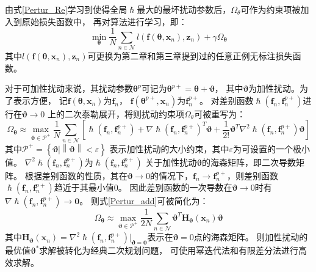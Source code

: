 由式\eqref{Pertur_Re}学习到使得全局$\hslash$最大的最坏扰动参数后，$\Omega_{\theta}$可作为约束项被加入到原始损失函数中，
再对算法进行学习，即：
\begin{equation}
    \label{Loss_Pertur_Re}
    \min _{\boldsymbol\theta} 
    \frac{1}{N} \sum_{n \in \mathcal{N}}l(\boldsymbol f\left(\boldsymbol\theta,\boldsymbol x_n\right), \boldsymbol{z}_n)
    +\gamma \Omega_{\boldsymbol\theta}
\end{equation}
其中$l(\boldsymbol f\left(\boldsymbol\theta,\boldsymbol x_n\right), \boldsymbol{z}_n)$可更换为第二章和第三章提到过的任意正例无标注损失函数。

对于可加性扰动来说，其扰动参数$\boldsymbol\theta^p$可记为$\boldsymbol\theta^{p+}=\boldsymbol\theta+\boldsymbol\vartheta $，
其中$\boldsymbol\vartheta$为加性扰动。为了表示方便，
记$\boldsymbol f\left(\boldsymbol\theta,\boldsymbol x_n\right)$为$\boldsymbol f_n$，
$\boldsymbol f\left(\boldsymbol\theta^{p+},\boldsymbol x_n\right)$为$\boldsymbol f_n^{p+}$。
对差别函数$\hslash\left(\boldsymbol f_n,\boldsymbol f_n^{p+}\right)$进行在$\boldsymbol \vartheta \to 0$
上的二次泰勒展开，将则扰动约束项$\Omega_{\theta}$可被重写为：
\begin{equation}
    \label{Pertur_add}
    \Omega_{\boldsymbol\theta}\approx \max _{\boldsymbol \vartheta \in \mathcal{P}^+}  \frac{1}{N} \sum_{n \in \mathcal{N}} \left[
    \hslash\left(\boldsymbol f_n,\boldsymbol f_n^{p+}\right)
    +{\nabla\hslash\left(\boldsymbol f_n,\boldsymbol f_n^{p+}\right)}^T \boldsymbol \vartheta
    +\frac{1}{2!}{\boldsymbol \vartheta}^T \nabla^2\hslash\left(\boldsymbol f_n,\boldsymbol f_n^{p+}\right) \boldsymbol \vartheta
    \right]
\end{equation}
其中$\mathcal{P}^+=\left\{\boldsymbol\vartheta | \left\|\boldsymbol\vartheta\right\|<\varepsilon \right\}$
表示加性扰动的大小约束，其中$\varepsilon$为可设置的一个极小值。
$\nabla^2\hslash\left(\boldsymbol f_n,\boldsymbol f_n^{p+}\right)$为$\hslash\left(\boldsymbol f_n,\boldsymbol f_n^{p+}\right)$
关于加性扰动$\boldsymbol \vartheta$的海森矩阵，即二次导数矩阵。
根据差别函数的性质，其在$\boldsymbol \vartheta \to 0$的情况下，$\boldsymbol f_n \to \boldsymbol f_n^{p+}$，则差别函数
$\hslash\left(\boldsymbol f_n,\boldsymbol f_n^{p+}\right)$趋近于其最小值0。
因此差别函数的一次导数在$\boldsymbol \vartheta \to 0$时有$\nabla\hslash\left(\boldsymbol f_n,\boldsymbol f_n^{p+}\right) \to \boldsymbol0$。
则式\eqref{Pertur_add}可被简化为：
\begin{equation}
    \label{Pertur_add_2}
    \Omega_{\boldsymbol\theta}\approx \max _{\boldsymbol \vartheta \in \mathcal{P}^+}  \frac{1}{2N} 
    \sum_{n \in \mathcal{N}} {\boldsymbol \vartheta}^T
    \boldsymbol H_{\boldsymbol\vartheta}\left(\boldsymbol x_n\right)
    \boldsymbol \vartheta
\end{equation}
其中$\boldsymbol H_{\boldsymbol\vartheta}\left(\boldsymbol x_n\right)=\nabla^2\hslash\left(\boldsymbol f_n,
\boldsymbol f_n^{p+}\right)\left.\right|_{\boldsymbol \vartheta=\boldsymbol0}$表示在$\boldsymbol \vartheta=0$点的海森矩阵。
则加性扰动的最优值$\boldsymbol \vartheta^*$求解被转化为经典二次规划问题，
可使用幂迭代法和有限差分法进行高效求解\cite{Gene_MatrixComputations_2013}。

